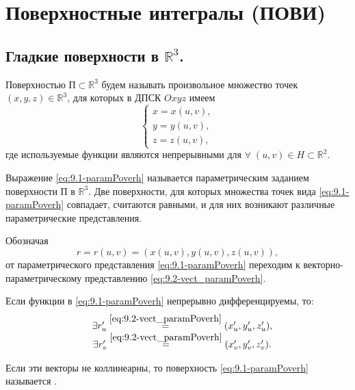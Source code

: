 \section{Поверхностные интегралы (ПОВИ)}

\subsection{Гладкие поверхности в $ \mathbb{R}^3 $.}

Поверхностью $\text{П} \subset \mathbb{R}^3 $ будем называть произвольное множество точек $ (x, y,z) \in \mathbb{R}^3 $, для которых в ДПСК $ Oxyz $ имеем
\begin{equation}
    \label{eq:9.1-paramPoverh}
    \begin{cases}
        x = x(u, v), \\
        y = y(u, v), \\
        z = z(u, v),
    \end{cases}
\end{equation}
где используемые функции являются непрерывными для $ \forall \; (u, v) \in H \subset \mathbb{R}^2 $.

Выражение \eqref{eq:9.1-paramPoverh}  называется параметрическим заданием поверхности П в $ \mathbb{R}^3 $.
Две поверхности, для которых множества точек вида \eqref{eq:9.1-paramPoverh} совпадает, считаются равными, и для них возникают различные параметрические представления. 

Обозначая 
\begin{equation}
    \label{eq:9.2-vect_paramPoverh}
    r = r(u, v) = (x(u,v), y(u,v), z(u,v)),
\end{equation}
от параметрического представления  \eqref{eq:9.1-paramPoverh} переходим к векторно-параметрическому представлению \eqref{eq:9.2-vect_paramPoverh}.

Если функции в \eqref{eq:9.1-paramPoverh} непрерывно дифференцируемы, то:
\begin{equation}
    \label{eq:9.3}
    \begin{matrix}
        & \exists r_u' \overset{\eqref{eq:9.2-vect_paramPoverh}}{=} (x_u', y_u', z_u'), \\
        & \exists r_v' \overset{\eqref{eq:9.2-vect_paramPoverh}}{=} (x_v', y_v', z_v').
    \end{matrix}
\end{equation}

Если эти векторы не коллинеарны, то поверхность \eqref{eq:9.1-paramPoverh} называется .

